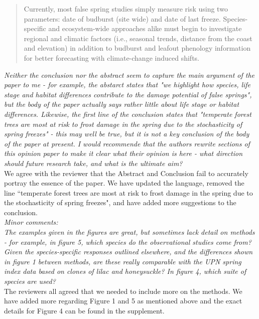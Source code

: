 \documentclass[11pt,a4paper]{article}
\begin{document}
\begin{quote}
Currently, most false spring studies simply measure risk using two parameters: date of budburst (site wide) and date of last freeze. Species-specific and ecosystem-wide approaches alike must begin to investigate regional and climatic factors (i.e., seasonal trends, distance from the coast and elevation) in addition to budburst and leafout phenology information for better forecasting with climate-change induced shifts. 
\end{quote} 

\textit{Neither the conclusion nor the abstract seem to capture the main argument of the paper to me - for example, the abstarct states that "we highlight how species, life stage and habitat differences contribute to the damage potential of false springs", but the body of the paper actually says rather little about life stage or habitat differences.  Likewise, the first line of the conclusion states that "temperate forest trees are most at risk to frost damage in the spring due to the stochasticity of spring freezes" - this may well be true, but it is not a key conclusion of the body of the paper at present. I would recommende that the authors rewrite sections of this opinion paper to make it clear what their opinion is here - what direction should future research take, and what is the ultimate aim?} \\

We agree with the reviewer that the Abstract and Conclusion fail to accurately portray the essence of the paper. We have updated the language, removed the line ``temperate forest trees are most at risk to frost damage in the spring due to the stochasticity of spring freezes", and have added more suggestions to the conclusion. \\


\textit{Minor comments: \\
The examples given in the figures are great, but sometimes lack detail on methods - for example, in figure 5, which species do the observational studies come from?  Given the species-specific responses outlined elsewhere, and the differences shown in figure 1 between methods, are these really comparable with the UPN spring index data based on clones of lilac and honeysuckle?
In figure 4, which suite of species are used?} \\

The reviewers all agreed that we needed to include more on the methods. We have added more regarding Figure 1 and 5 as mentioned above and the exact details for Figure 4 can be found in the supplement. \\




\newpage

\end{document}
